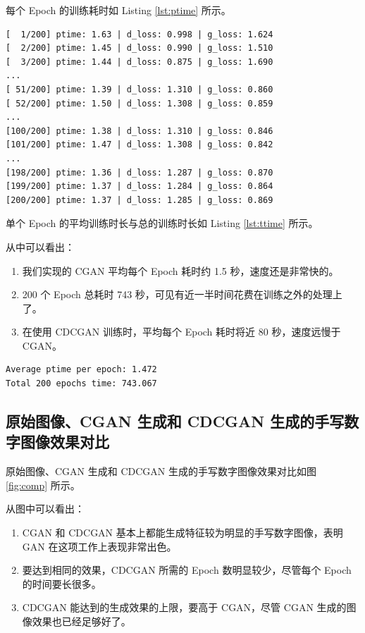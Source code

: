 \documentclass[a4paper, 12pt]{article}
\begin{document}
每个 Epoch 的训练耗时如 Listing \ref{lst:ptime} 所示。

\begin{lstlisting}[style=myPlain,caption={每个 Epoch 的训练耗时},label={lst:ptime}]
[  1/200] ptime: 1.63 | d_loss: 0.998 | g_loss: 1.624
[  2/200] ptime: 1.45 | d_loss: 0.990 | g_loss: 1.510
[  3/200] ptime: 1.44 | d_loss: 0.875 | g_loss: 1.690
...
[ 51/200] ptime: 1.39 | d_loss: 1.310 | g_loss: 0.860
[ 52/200] ptime: 1.50 | d_loss: 1.308 | g_loss: 0.859
...
[100/200] ptime: 1.38 | d_loss: 1.310 | g_loss: 0.846
[101/200] ptime: 1.47 | d_loss: 1.308 | g_loss: 0.842
...
[198/200] ptime: 1.36 | d_loss: 1.287 | g_loss: 0.870
[199/200] ptime: 1.37 | d_loss: 1.284 | g_loss: 0.864
[200/200] ptime: 1.37 | d_loss: 1.285 | g_loss: 0.869
\end{lstlisting}

\vspace{0.5\baselineskip}

单个 Epoch 的平均训练时长与总的训练时长如 Listing \ref{lst:ttime} 所示。

从中可以看出：

\begin{enumerate}[leftmargin=*,labelindent=2em]
\item 我们实现的 CGAN 平均每个 Epoch 耗时约 1.5 秒，速度还是非常快的。
\item 200 个 Epoch 总耗时 743 秒，可见有近一半时间花费在训练之外的处理上了。
\item 在使用 CDCGAN 训练时，平均每个 Epoch 耗时将近 80 秒，速度远慢于 CGAN。
\end{enumerate}

\begin{lstlisting}[style=myPlain,caption={单个 Epoch 的平均训练时长与总的训练时长},label={lst:ttime}]
Average ptime per epoch: 1.472
Total 200 epochs time: 743.067
\end{lstlisting}

\subsection{原始图像、CGAN 生成和 CDCGAN 生成的手写数字图像效果对比}
原始图像、CGAN 生成和 CDCGAN 生成的手写数字图像效果对比如图 \ref{fig:comp} 所示。

从图中可以看出：

\begin{enumerate}[leftmargin=*, labelindent=2em]
\item CGAN 和 CDCGAN 基本上都能生成特征较为明显的手写数字图像，表明 GAN 在这项工作上表现非常出色。
\item 要达到相同的效果，CDCGAN 所需的 Epoch 数明显较少，尽管每个 Epoch 的时间要长很多。
\item CDCGAN 能达到的生成效果的上限，要高于 CGAN，尽管 CGAN 生成的图像效果也已经足够好了。
\end{enumerate}
\end{document}

